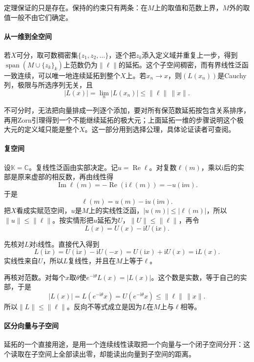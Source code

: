 定理保证的只是存在。保持的约束只有两条：在$M$上的取值和范数上界，$M$外的取值一般不由它们确定。

\paragraph{从一维到全空间}
若$X$可分，取可数稠密集$\{z_1,z_2,\ldots\}$，逐个把$z_k$添入定义域并重复上一步，得到$\operatorname{span}(M\cup\{z_k\}_k)$上范数仍为$\lVert\ell\rVert$的延拓。这个子空间稠密，而有界线性泛函一致连续，可以唯一地连续延拓到整个$X$上。若$x_n\to x$，则$(L(x_n))$是Cauchy列，极限与所选序列无关，且
\[
\lvert L(x)\rvert=\lim_n\lvert L(x_n)\rvert\leq\lVert\ell\rVert\,\lVert x\rVert .
\]

不可分时，无法把向量排成一列逐个添加，要对所有保范数延拓按包含关系排序，再用Zorn引理得到一个不能继续延拓的极大元；上面延拓一维的步骤说明这个极大元的定义域只能是整个$X$。这一部分用到选择公理，具体论证读者可查阅。

\paragraph{复空间}
设$\mathbb K=\mathbb C$。复线性泛函由实部决定。记$u=\operatorname{Re}\ell$。对复数$\ell(m)$，乘以$\mathrm i$后的实部是原来虚部的相反数，再由线性得
\[
\operatorname{Im}\ell(m)=-\operatorname{Re}(\mathrm i\ell(m))=-u(\mathrm im).
\]
于是
\[
\ell(m)=u(m)-\mathrm iu(\mathrm im).
\]
把$X$看成实赋范空间，$u$是$M$上的实线性泛函，$\lvert u(m)\rvert\leq\lvert\ell(m)\rvert$，所以$\lVert u\rVert\leq\lVert\ell\rVert$。按实情形把$u$延拓为$U$，$\lVert U\rVert\leq\lVert\ell\rVert$，再令
\[
L(x)=U(x)-\mathrm iU(\mathrm ix).
\]

先核对$L$对$\mathrm i$线性。直接代入得到
\[
L(\mathrm ix)=U(\mathrm ix)-\mathrm iU(-x)=U(\mathrm ix)+\mathrm iU(x)=\mathrm iL(x).
\]
实线性来自$U$，所以$L$复线性，并且在$M$上等于$\ell$。

再核对范数。对每个$x$取$\theta$使$e^{-\mathrm i\theta}L(x)=\lvert L(x)\rvert$。这个数是实数，等于自己的实部，于是
\[
\lvert L(x)\rvert=L(e^{-\mathrm i\theta}x)=U(e^{-\mathrm i\theta}x)\leq\lVert\ell\rVert\,\lVert x\rVert .
\]
所以$\lVert L\rVert\leq\lVert\ell\rVert$。反向不等式成立是因为$L$在$M$上与$\ell$相等。

\paragraph{区分向量与子空间}
延拓的一个直接用途，是用一个连续线性读取把一个向量与一个闭子空间分开：这个读取在子空间上全部读出零，却能读出向量到子空间的距离。

